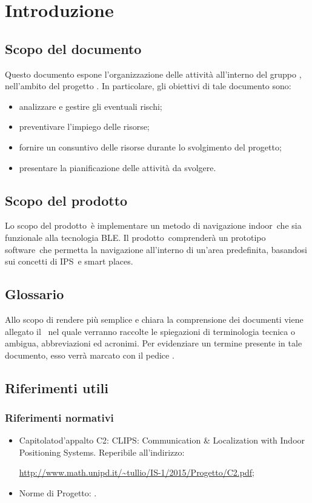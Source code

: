\documentclass[../PianoProgetto.tex]{subfiles}
\begin{document}
\section{Introduzione}
	\subsection{Scopo del documento}
	Questo documento espone l'organizzazione delle attività all'interno del gruppo \leaf , nell'ambito del progetto \progetto \g .
In particolare, gli obiettivi di tale documento sono:
	\begin{itemize}
	\item analizzare e gestire gli eventuali rischi;
	\item preventivare l'impiego delle risorse;
	\item fornire un consuntivo delle risorse durante lo svolgimento del progetto;
	\item presentare la pianificazione delle attività da svolgere.
	\end{itemize}
	
	\subsection{Scopo del prodotto}
	Lo scopo del prodotto\g\ è implementare un metodo di navigazione indoor\g\ che sia funzionale alla tecnologia BLE\g .
	Il prodotto\g\ comprenderà un prototipo software\g\ che permetta la navigazione all'interno di un'area predefinita, basandosi sui concetti di IPS\g\ e smart places\g.

	\subsection{Glossario}
		Allo scopo di rendere più semplice e chiara la comprensione dei documenti
viene allegato il \glossariov\ nel quale verranno raccolte le spiegazioni di
terminologia tecnica o ambigua, abbreviazioni ed acronimi. Per evidenziare
un termine presente in tale documento, esso verrà marcato con il pedice \g.


	\subsection{Riferimenti utili}

		\subsubsection{Riferimenti normativi}
		\begin{itemize}
		\item Capitolato\g d'appalto C2: CLIPS\g: Communication \& Localization with Indoor Positioning Systems. Reperibile all'indirizzo: \par
			\url{http://www.math.unipd.it/~tullio/IS-1/2015/Progetto/C2.pdf};
		\item Norme di Progetto: \normediprogettov.
		\end{itemize}
\end{document}
